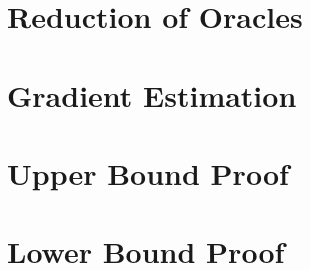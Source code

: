 
\section{Reduction of Oracles}
\label{sec:orrel}


\section{Gradient Estimation}
\label{sec:appendix-grad}


\section{Upper Bound Proof}
\label{sec:appendix-md}


\section{Lower Bound Proof}
\label{sec:appendix-lb-proof}



